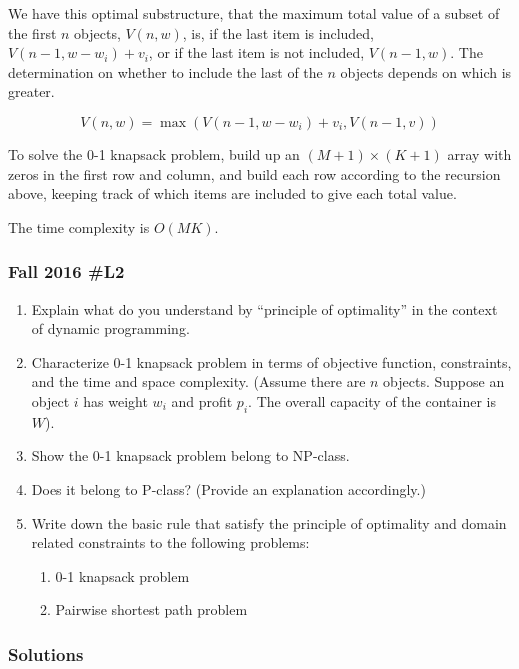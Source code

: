 \begin{enumerate}[label=\alph*.]
	 We have this optimal substructure, that the maximum total value of a subset of the first $n$ objects, $V(n,w)$, is, if the last item is included, $V(n-1,w-w_i) + v_i$, or if the last item is not included, $V(n-1,w)$.  The determination on whether to include the last of the $n$ objects depends on which is greater.  
	 
	 $$V(n,w) = \max( V(n-1,w-w_i) + v_i, V(n-1,v))$$
	 
	 To solve the 0-1 knapsack problem, build up an $(M+1) \times (K+1)$ array with zeros in the first row and column, and build each row according to the recursion above, keeping track of which items are included to give each total value.  
	 
	 The time complexity is $O(MK)$.  
\end{enumerate}

\subsubsection{Fall 2016 \#L2}

	\begin{enumerate}
		\item 	Explain what do you understand by ``principle of optimality'' in the context of dynamic programming.
		\item Characterize 0-1 knapsack problem in terms of objective function, constraints, and the time and space complexity.  (Assume there are $n$ objects.  Suppose an object $i$ has weight $w_i$ and profit $p_i$.  The overall capacity of the container is $W$).
		\item Show the 0-1 knapsack problem belong to NP-class.
		\item Does it belong to P-class?  (Provide an explanation accordingly.)
		\item Write down the basic rule that satisfy the principle of optimality and domain related constraints to the following problems:
		\begin{enumerate}
			\item 0-1 knapsack problem
			\item Pairwise shortest path problem
		\end{enumerate}
	\end{enumerate}

\subsubsection{Solutions}

